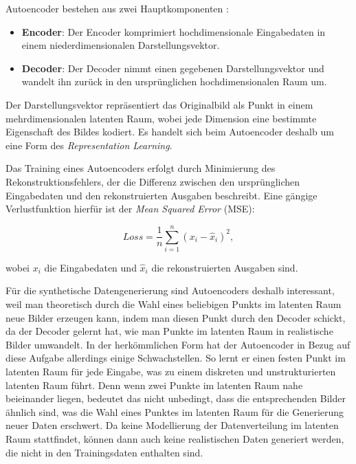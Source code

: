 Autoencoder bestehen aus zwei Hauptkomponenten \parencite{Foster2020gendeeplearning}:

\begin{itemize}
	\item \textbf{Encoder}: Der Encoder komprimiert hochdimensionale Eingabedaten in einem niederdimensionalen Darstellungsvektor.
	\item \textbf{Decoder}: Der Decoder nimmt einen gegebenen Darstellungsvektor und wandelt ihn zurück in den ursprünglichen hochdimensionalen Raum um.
\end{itemize}

Der Darstellungsvektor repräsentiert das Originalbild als Punkt in einem mehrdimensionalen latenten Raum, wobei jede Dimension eine bestimmte Eigenschaft des Bildes kodiert. Es handelt sich beim Autoencoder deshalb um eine Form des \textit{Representation Learning}.

Das Training eines Autoencoders erfolgt durch Minimierung des Rekonstruktionsfehlers, der die Differenz zwischen den ursprünglichen Eingabedaten und den rekonstruierten Ausgaben beschreibt. Eine gängige Verlustfunktion hierfür ist der \textit{Mean Squared Error} (MSE):

\begin{equation}
	Loss=\frac{1}{n}\sum_{i=1}^n (x_i-\hat{x}_i)^2,
	\label{eq:loss-mse}
\end{equation}

wobei $x_i$ die Eingabedaten und $\hat{x}_i$ die rekonstruierten Ausgaben sind.

Für die synthetische Datengenerierung sind Autoencoders deshalb interessant, weil man theoretisch durch die Wahl eines beliebigen Punkts im latenten Raum neue Bilder erzeugen kann, indem man diesen Punkt durch den Decoder schickt, da der Decoder gelernt hat, wie man Punkte im latenten Raum in realistische Bilder umwandelt. \parencite{Foster2020gendeeplearning} In der herkömmlichen Form hat der Autoencoder in Bezug auf diese Aufgabe allerdings einige Schwachstellen. So lernt er einen festen Punkt im latenten Raum für jede Eingabe, was zu einem diskreten und unstrukturierten latenten Raum führt. Denn wenn zwei Punkte im latenten Raum nahe beieinander liegen, bedeutet das nicht unbedingt, dass die entsprechenden Bilder ähnlich sind, was die Wahl eines Punktes im latenten Raum für die Generierung neuer Daten erschwert. Da keine Modellierung der Datenverteilung im latenten Raum stattfindet, können dann auch keine realistischen Daten generiert werden, die nicht in den Trainingsdaten enthalten sind.

